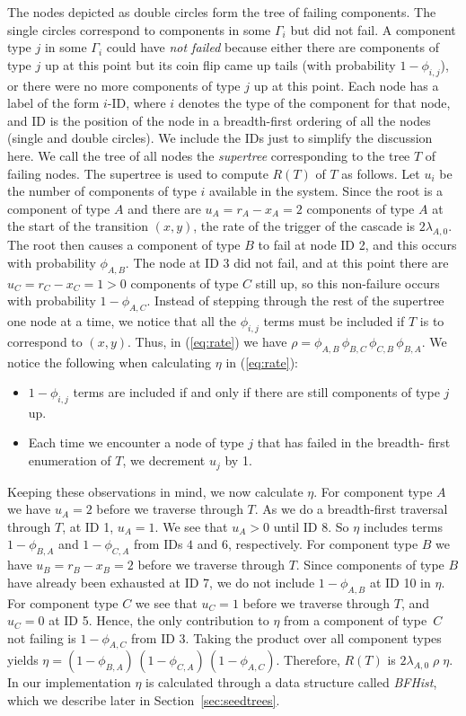 \documentclass[12pt]{article}
\newcommand{\varName}[1]{\textrm{\it#1}}
\begin{document}
The nodes depicted as double circles form the tree of failing components. The
single circles correspond to components in some $\Gamma_i$ but did not fail.  A
component type $j$ in some $\Gamma_i$ could have \textit{not failed} because
either there are components of type $j$ up at this point but its coin flip came
up tails (with probability $1 - \phi_{i, j}$), or there were no more components
of type $j$ up at this point. Each node has a label of the form $i$-ID, where
$i$ denotes the type of the component for that node, and ID is the position of
the node in a breadth-first ordering of all the nodes (single and double
circles). We include the IDs just to simplify the discussion here. We call the
tree of all nodes the \textit{supertree} corresponding to the tree $T$ of
failing nodes. The supertree is used to compute $R(T)$ of $T$ as follows. Let
$u_i$ be the number of components of type $i$ available in the system. Since the
root is a component of type $A$ and there are $u_A = r_A - x_A = 2$ components
of type $A$ at the start of the transition $(x, y)$, the rate of the trigger of
the cascade is $2 \lambda_{A, 0}$. The root then causes a component of type $B$
to fail at node ID 2, and this occurs with probability $\phi_{A, B}$. The node
at ID 3 did not fail, and at this point there are $u_C = r_C - x_C = 1 > 0$
components of type $C$ still up, so this non-failure occurs with probability $1
- \phi_{A,C}$. Instead of stepping through the rest of the supertree one node at
a time, we notice that all the $\phi_{i, j}$ terms must be included if $T$ is to
correspond to $(x, y)$. Thus, in (\ref{eq:rate}) we have $\rho = \phi_{A, B} \,
\phi_{B, C} \, \phi_{C, B} \, \phi_{B, A}$. We notice the following when
calculating $\eta$ in (\ref{eq:rate}):
\begin{itemize}
\item $1 - \phi_{i, j}$ terms are included if and only if there are still
components of type $j$ up.
\item Each time we encounter a node of type $j$ that has failed in the breadth-
first enumeration of $T$, we decrement $u_j$ by 1.
\end{itemize}
Keeping these observations in mind, we now calculate $\eta$. For component type
$A$ we have $u_A = 2$ before we traverse through $T$. As we do a breadth-first
traversal through $T$, at ID 1, $u_A = 1$. We see that $u_A > 0$ until ID 8. So
$\eta$ includes terms $1 - \phi_{B, A}$ and $1 - \phi_{C, A}$ from IDs $4$ and
$6$, respectively. For component type $B$ we have $u_B = r_B - x_B  = 2$ before
we traverse through $T$. Since components of type $B$ have already been
exhausted at ID 7, we do not include $1 - \phi_{A, B}$ at ID 10 in $\eta$. For
component type $C$ we see that $u_C = 1$ before we traverse through $T$, and
$u_C = 0$ at ID 5. Hence, the only contribution to $\eta$ from a component of
type~$C$ not failing is $1 - \phi_{A, C}$ from ID 3. Taking the product over all
component types yields $\eta = (1 - \phi_{B, A}) \, (1 - \phi_{C, A}) \, (1 -
\phi_{A,C})$. Therefore, $R(T)$ is $2 \lambda_{A, 0} \; \rho \; \eta$. In our
implementation $\eta$ is calculated through a data structure called
\varName{BFHist}, which we describe later in Section~\ref{sec:seedtrees}.
\end{document}
